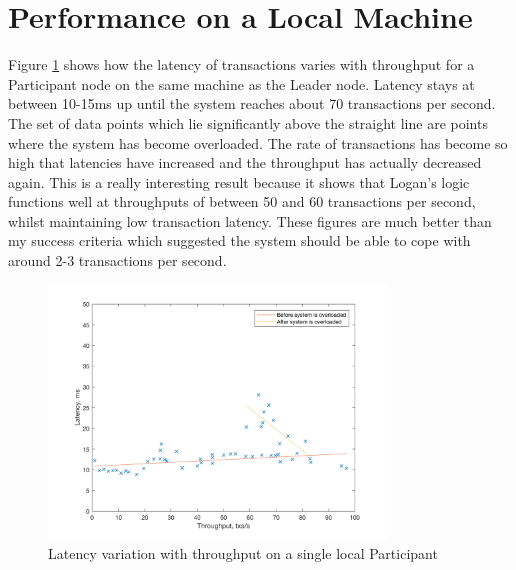\documentclass[12pt,a4paper,twoside,openright]{report}
\begin{document}
	\section{Performance on a Local Machine}
	Figure \ref{fig:singlocal} shows how the latency of transactions varies with throughput for a Participant node on the same machine as the Leader node.
	Latency stays at between 10-15ms up until the system reaches about 70 transactions per second.
	The set of data points which lie significantly above the straight line are points where the system has become overloaded. 
	The rate of transactions has become so high that latencies have increased and the throughput has actually decreased again. 
	This is a really interesting result because it shows that Logan's logic functions well at throughputs of between 50 and 60 transactions per second, whilst maintaining low transaction latency.
	These figures are much better than my success criteria which suggested the system should be able to cope with around 2-3 transactions per second.\\
	\begin{figure}
		\centering
		\includegraphics[width=0.8\textwidth]{figs/single_local_worker.png}
		\caption{Latency variation with throughput on a single local Participant}
		\label{fig:singlocal}
	\end{figure}
\end{document}
